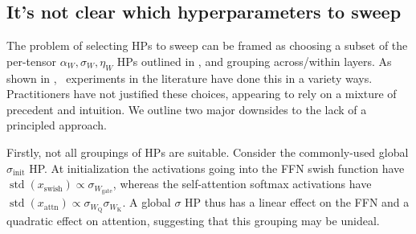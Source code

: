
\subsection{It's not clear which hyperparameters to sweep} \label{sec:challenges:which_hps}

The problem of selecting HPs to sweep can be framed as choosing a subset of the per-tensor $\alpha_W, \sigma_W, \eta_W$ HPs outlined in , and grouping across/within layers. As shown in , \mut\ experiments in the literature have done this in a variety ways. Practitioners have not justified these choices, appearing to rely on a mixture of precedent and intuition. We outline two major downsides to the lack of a principled approach.

Firstly, not all groupings of HPs are suitable. Consider the commonly-used global $\sigma_\mathrm{init}$ HP. At initialization the activations going into the FFN swish function have $\operatorname{std}(x_\mathrm{swish}) \propto \sigma_{W_\mathrm{gate}}$, whereas the self-attention softmax activations have $\operatorname{std}(x_\mathrm{attn}) \propto \sigma_{W_\mathrm{Q}}\sigma_{W_\mathrm{K}}$. A global $\sigma$ HP thus has a linear effect on the FFN and a quadratic effect on attention, suggesting that this grouping may be unideal.

